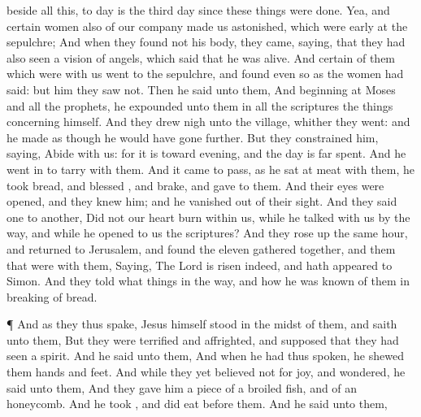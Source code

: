 {beside
all
this, to
day
is the
third
day
since these
things were
done.
Yea,
and
certain
women also
of our
company
made
us
astonished, which
were
early
at the
sepulchre;
And when they
found
not
his
body, they
came, saying,
that they
had
also
seen a
vision of
angels,
which
said that
he was
alive.
And
certain of them which
were
with
us
went
to the
sepulchre,
and
found
{}
even
so
as the
women had
said:
but
him they
saw
not.
Then
he
said
unto
them,
{}
And
beginning
at
Moses
and
all the
prophets, he
expounded unto
them
in
all the
scriptures the
things
concerning
himself.
And they drew
nigh
unto the
village,
whither they
went:
and
he made as
though he would have
gone
further.
But they
constrained
him,
saying,
Abide
with
us:
for it
is
toward
evening,
and the
day is far
spent.
And he went
in to
tarry
with
them.
And it came to
pass, as
he sat at
meat
with
them, he
took
bread, and
blessed
{},
and
brake, and
gave to
them.
And
their
eyes were
opened,
and they
knew
him;
and
he vanished
out
of
their
sight.
And they
said one
to
another,
Did
not
our
heart
burn
within
us,
while he
talked with
us
by the
way,
and
while he
opened to
us the
scriptures?
And they rose
up the
same
hour, and
returned
to
Jerusalem,
and
found the
eleven gathered
together,
and them that
were
with
them,
Saying, The
Lord is
risen
indeed,
and hath
appeared to
Simon.
And
they
told what
things
{}
in the
way,
and
how he was
known of
them
in
breaking of
bread.
\par }{\PP {}¶ And
as
they
thus
spake,
Jesus
himself
stood
in the
midst of
them,
and
saith unto
them,
{}
But they were
terrified
and
affrighted, and supposed
that they had
seen a
spirit.
And he
said unto
them,
{}
And
when he
had
thus
spoken, he
shewed
them
{}
hands
and
{}
feet.
And while
they
yet believed
not
for
joy,
and
wondered, he
said unto
them,
{}
And they
gave
him a
piece of a
broiled
fish,
and
of
an
honeycomb.
And he
took
{}, and did
eat
before
them.
And he
said unto
them,
{}}
